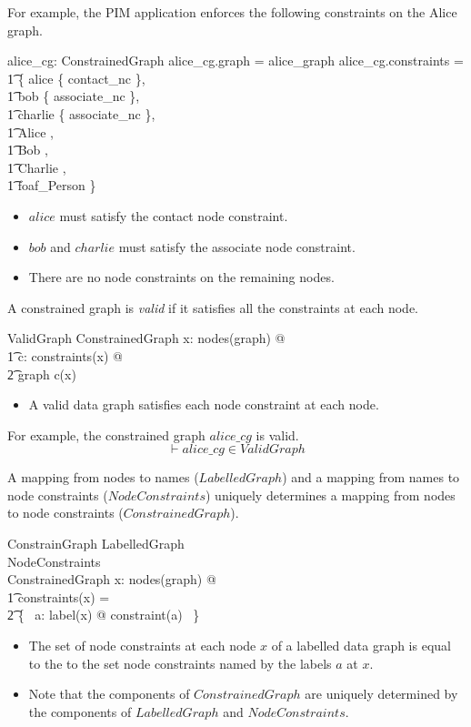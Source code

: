 \documentclass{article}
\begin{document}
For example, the PIM application enforces the following constraints on the Alice graph.
\begin{axdef}
	alice\_cg: ConstrainedGraph
\where
	alice\_cg.graph = alice\_graph
\also
	alice\_cg.constraints = \\
\t1		\{ alice \mapsto \{ contact\_nc \}, \\
\t1		bob \mapsto \{ associate\_nc \}, \\
\t1		charlie \mapsto \{ associate\_nc \}, \\
\t1		Alice \mapsto \emptyset, \\
\t1		Bob \mapsto \emptyset, \\
\t1		Charlie \mapsto \emptyset, \\
\t1		foaf\_Person \mapsto \emptyset \}
\end{axdef}
\begin{itemize}
\item $alice$ must satisfy the contact node constraint.
\item $bob$ and $charlie$ must satisfy the associate node constraint.
\item There are no node constraints on the remaining nodes.
\end{itemize}

A constrained graph is {\em valid} if it satisfies all the constraints at each node.
\begin{schema}{ValidGraph}
	ConstrainedGraph
\where
	\forall x: nodes(graph) @ \\
\t1		\forall c: constraints(x) @ \\
\t2			graph \in c(x)
\end{schema}
\begin{itemize}
\item A valid data graph satisfies each node constraint at each node.
\end{itemize}

For example, the constrained graph $alice\_cg$ is valid.
\[\vdash
	alice\_cg \in ValidGraph
\]

A mapping from nodes to names ($LabelledGraph$) and a mapping from names to node constraints ($NodeConstraints$) uniquely determines a
mapping from nodes to node constraints ($ConstrainedGraph$).
\begin{schema}{ConstrainGraph}
	LabelledGraph \\
	NodeConstraints \\
	ConstrainedGraph
\where
	\forall x: nodes(graph) @ \\
\t1		constraints(x) = \\
\t2			\{~ a: label(x) @ constraint(a) ~\}
\end{schema}
\begin{itemize}
\item The set of node constraints at each node $x$ of a labelled data graph is equal to the to the set 
node constraints named by the labels $a$ at $x$.
\item Note that the components of $ConstrainedGraph$ are uniquely determined by the components of $LabelledGraph$
and $NodeConstraints$.
\end{itemize}
\end{document}
